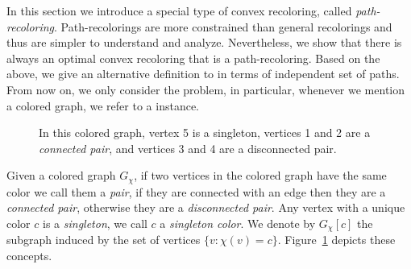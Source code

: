 \label{sec:path_recoloring}

In this section we introduce a special type of convex recoloring,
called \emph{path-recoloring}. 
%
Path-recolorings are more constrained than general recolorings and thus are simpler to
understand and analyze.
%
Nevertheless, 
we show that there is always an optimal convex recoloring that is a path-recoloring.
%
Based on the above, 
we give an alternative definition to \TWOCR{} in terms of independent set of paths.
%
From now on, we only consider the \TWOCR{} problem,
in particular, 
whenever we mention a colored graph, 
we refer to a \TWOCR{} instance.

\begin{figure}
\centering

\caption{
\label{fig:concepts}
In this colored graph, vertex 5 is a singleton, vertices 1 and 2
are a \emph{connected pair}, and vertices 3 and 4 are a disconnected pair.
}
\end{figure}

Given a colored graph $G_\chi$, 
if two vertices in the colored graph have the same color we call them a \emph{pair}, 
if they are connected with an edge then they are a \emph{connected pair}, 
otherwise they are a \emph{disconnected pair}.  
%
Any vertex with a unique color $c$ is a \emph{singleton}, 
we call $c$ a \emph{singleton color}.
%
We denote by $G_\chi[c]$ the subgraph induced by the set of vertices $\{v : \chi(v) = c\}$.
Figure~\ref{fig:concepts} depicts these concepts.
%